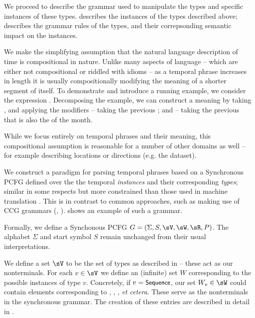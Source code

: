 We proceed to describe the grammar used to manipulate the types and specific
	instances of these types.
 describes the instances of the types described
	above;  describes the grammar rules of the types,
	and their correpsonding semantic impact on the instances.

We make the simplifying assumption that the natural language description
	of time is compositional in nature.
Unlike many aspects of language  -- which are either not compositional or
	riddled with idioms -- as a temporal phrase increases in length it is
	usually compositionally modifying the meaning of a shorter segment of itself.
To demonstrate and introduce a running example, we consider the expression
	.
Decomposing the example, we can construct a meaning by taking ,
	and applying the modifiers  -- taking the previous ;
	and  -- taking the previous  that is
	also the  of the month.

While we focus entirely on temporal phrases and their meaning, this
	compositional assumption is reasonable for a number of other domains as 
	well -- for example describing locations or directions (e.g. the 
	 dataset).

We construct a paradigm for parsing temporal phrases based on a Synchronous
	PCFG defined over the the temporal \textit{instances} and their
	corresponding \textit{types}; similar in some respects but more
	constrained than those used in machine translation 
	\cite{key:2001yamada-syntaxmt}.
This is in contrast to common approaches, such as making use of CCG 
	grammars (, ).
\needfig shows an example of such a grammar.

Formally, we define a Synchonous PCFG 
	$G = \left(\Sigma,S,\sV,\sW,\sR,P\right)$.
The alphabet $\Sigma$ and start symbol $S$ remain unchanged from their
	usual interpretations.

We define a set $\sV$ to be the set of types as described in
	 -- these act as our nonterminals.
For each $v \in \sV$ we define an (infinite) set $W$ corresponding to the 
	possible instances of type $v$.
Concretely, if $v=\textsf{\small{Sequence}}$, our set $W_v \in \sW$ could contain elements
	corresponding to , , ,
	\textit{et cetera}.
These serve as the nonterminals in the synchronous grammar.
The creation of these entries are described in detail in .

